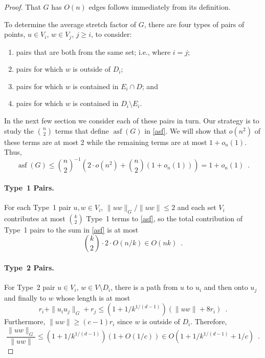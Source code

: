 \documentclass{patmorin}
\DeclareMathOperator{\asf}{asf}
\begin{document}
\begin{proof}
  That $G$ has $O(n)$ edges follows immediately from its definition.

  To determine the average stretch factor of $G$, there are four types
  of pairs of points, $u\in V_i$, $w\in V_j$, $j\ge i$, to consider:
  \begin{enumerate}
    \item pairs that are both from the same set; i.e., where $i=j$;
    \item pairs for which $w$ is outside of $D_i$;
    \item pairs for which $w$ is contained in $E_i\cap D$; and
    \item pairs for which $w$ is contained in $D_i\setminus E_i$.
  \end{enumerate}
  In the next few section we consider each of these pairs in turn.
  Our strategy is to study the $\binom{n}{2}$ terms that define $\asf(G)$
  in \eqref{asf}.  We will show that $o(n^2)$ of these terms are at most
  2 while the remaining terms are at most $1+o_n(1)$.  Thus,
  \[
     \asf(G)\le \binom{n}{2}^{-1}\left(2\cdot o(n^2)
                                       +\binom{n}{2}(1+o_n(1))\right)
     = 1+o_n(1) \enspace .
  \]

  \paragraph{Type~1 Pairs.}
  For each Type~1 pair $u,w\in V_i$, $\|uw\|_G/\|uw\|\le 2$ and each set
  $V_i$ contributes at most $\binom{k}{2}$ Type~1 terms to \eqref{asf},
  so the total contribution of Type~1 pairs to the sum in \eqref{asf} is at most
  \[
    \binom{k}{2}\cdot 2 \cdot O(n/k) \in O(nk)
      \enspace .
  \]

  \paragraph{Type~2 Pairs.}
  For Type~2 pair $u\in V_i$, $w\in V\setminus D_i$, there is a path
  from $u$ to $u_i$ and then onto $u_j$ and finally to $w$ whose length
  is at most
  \[
     r_i + \|u_iu_j\|_G + r_j
      \le (1+1/k^{1/(d-1)})(\|uw\| + 8r_i) \enspace .
  \]
  Furthermore, $\|uw\|\ge (c-1)r_i$ since $w$ is outside of $D_i$.
  Therefore,
  \[
    \frac{\|uw\|_G}{\|uw\|}\le (1+1/k^{1/(d-1)})(1+O(1/c)) 
       \in O(1+1/k^{1/(d-1)}+1/c) \enspace .
  \]


\end{proof}
\end{document}
